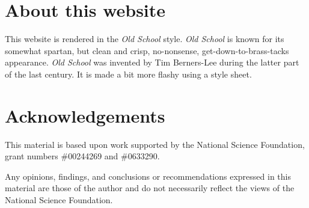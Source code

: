 \documentclass{article}
\begin{document}
\section*{About this website}
This website is rendered in the \emph{Old School} style.
\emph{Old School} is known for its somewhat spartan,
but clean and crisp, no-nonsense, get-down-to-brass-tacks
appearance. \emph{Old School} was invented by
Tim Berners-Lee during the latter part of the last 
century. It is made a bit more flashy using a
style sheet.

\section*{Acknowledgements}

This material is based upon work supported by the
National Science Foundation, grant numbers \#00244269 and \#0633290.

Any opinions, findings, and conclusions or recommendations
expressed in this material are those of the author and
do not necessarily reflect the views of the National Science Foundation.
\end{document}
